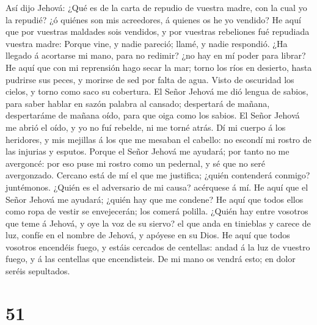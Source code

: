  Así dijo Jehová: ¿Qué es de la carta de repudio de
vuestra madre, con la cual yo la repudié? ¿ó quiénes son mis acreedores,
á quienes os he yo vendido? He aquí que por vuestras maldades sois
vendidos, y por vuestras rebeliones fué repudiada vuestra madre:
 Porque vine, y nadie pareció; llamé, y nadie respondió.
¿Ha llegado á acortarse mi mano, para no redimir? ¿no hay en mí poder
para librar? He aquí que con mi reprensión hago secar la mar; torno los
ríos en desierto, hasta pudrirse sus peces, y morirse de sed por falta
de agua.  Visto de oscuridad los cielos, y torno como saco
su cobertura.  El Señor Jehová me dió lengua de sabios,
para saber hablar en sazón palabra al cansado; despertará de mañana,
despertaráme de mañana oído, para que oiga como los sabios.
 El Señor Jehová me abrió el oído, y yo no fuí rebelde, ni
me torné atrás.  Dí mi cuerpo á los heridores, y mis
mejillas á los que me mesaban el cabello: no escondí mi rostro de las
injurias y esputos.  Porque el Señor Jehová me ayudará;
por tanto no me avergoncé: por eso puse mi rostro como un pedernal, y sé
que no seré avergonzado.  Cercano está de mí el que me
justifica; ¿quién contenderá conmigo? juntémonos. ¿Quién es el
adversario de mi causa? acérquese á mí.  He aquí que el
Señor Jehová me ayudará; ¿quién hay que me condene? He aquí que todos
ellos como ropa de vestir se envejecerán; los comerá polilla.
 ¿Quién hay entre vosotros que teme á Jehová, y oye la
voz de su siervo? el que anda en tinieblas y carece de luz, confíe en el
nombre de Jehová, y apóyese en su Dios.  He aquí que
todos vosotros encendéis fuego, y estáis cercados de centellas: andad á
la luz de vuestro fuego, y á las centellas que encendisteis. De mi mano
os vendrá esto; en dolor seréis sepultados.

\hypertarget{section-50}{%
\section{51}\label{section-50}}

